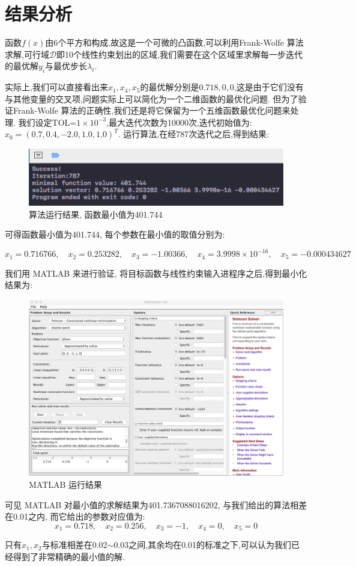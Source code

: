 \section{结果分析}

函数$f(x)$由6个平方和构成,故这是一个可微的凸函数,可以利用Frank-Wolfe 算法求解,可行域$\mathcal{D}$即10个线性约束划出的区域,我们需要在这个区域里求解每一步迭代的最优解$y_i$与最优步长$\lambda_i$.

实际上,我们可以直接看出来$x_1,x_4,x_5$的最优解分别是$0.718, 0, 0$,这是由于它们没有与其他变量的交叉项,问题实际上可以简化为一个二维函数的最优化问题. 但为了验证Frank-Wolfe 算法的正确性,我们还是将它保留为一个五维函数最优化问题来处理. 我们设定TOL=$1\times10^{-3}$,最大迭代次数为10000次,迭代初始值为:$x_0=(0.7,0.4,-2.0,1.0,1.0)^T$. 运行算法,在经787次迭代之后,得到结果:
\begin{figure}[htp]
    \centering
    \includegraphics[scale = 0.7]{pic/3.png}
    \caption{ 算法运行结果, 函数最小值为401.744}
\end{figure}

可得函数最小值为401.744, 每个参数在最小值的取值分别为:

\begin{equation}
x_1=0.716766,\quad x_2=0.253282,\quad x_3=-1.00366,\quad x_4=3.9998\times10^{-16},\quad x_5=-0.000434627
\end{equation}

我们用 MATLAB 来进行验证, 将目标函数与线性约束输入进程序之后,得到最小化结果为:
\begin{figure}[htp]
    \centering
    \includegraphics[scale = 0.3]{pic/4.jpeg}
    \caption{ MATLAB 运行结果}
\end{figure}

可见 MATLAB 对最小值的求解结果为401.7367088016202, 与我们给出的算法相差在0.01之内, 而它给出的参数对应值为:
\begin{equation}
x_1=0.718,\quad x_2=0.256,\quad x_3=-1,\quad x_4=0,\quad x_5=0
\end{equation}

只有$x_1,x_2$与标准相差在0.02$\sim$0.03之间,其余均在0.01的标准之下,可以认为我们已经得到了非常精确的最小值的解.
